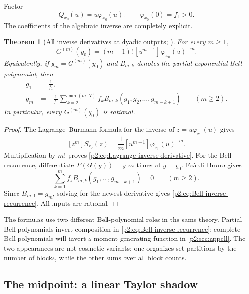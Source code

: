 \documentclass[11pt,oneside]{article}
\numberwithin{equation}{section}
\newtheorem{theorem}{Theorem}[section]
\theoremstyle{definition}
\theoremstyle{remark}
\newcommand{\InvF}{G}
\begin{document}
Factor
\begin{equation}
 Q_{x_0}(u)=u\varphi_{x_0}(u),
 \qquad
 \varphi_{x_0}(0)=f_1>0.
 \label{p2:eq:Q-phi}
\end{equation}
The coefficients of the algebraic inverse are completely explicit.

\begin{theorem}[All inverse derivatives at dyadic outputs; \statusnew]
\label{p2:thm:inverse-derivatives}
For every $m\ge1$,
\begin{equation}
 \boxed{
 \InvF^{(m)}(y_0)
 =(m-1)!\,[u^{m-1}]\,\varphi_{x_0}(u)^{-m}.
 }
 \label{p2:eq:Lagrange-inverse-derivative}
\end{equation}
Equivalently, if $g_m=\InvF^{(m)}(y_0)$ and $B_{m,k}$ denotes the partial exponential Bell
polynomial, then
\begin{align}
 g_1&=\frac1{f_1},
 \label{p2:eq:g1}\\
 g_m&=-\frac1{f_1}
 \sum_{k=2}^{\min(m,N)}f_k
 B_{m,k}(g_1,g_2,\ldots,g_{m-k+1})
 \qquad(m\ge2).
 \label{p2:eq:Bell-inverse-recurrence}
\end{align}
In particular, every $\InvF^{(m)}(y_0)$ is rational.
\end{theorem}

\begin{proof}
The Lagrange--B\"urmann formula for the inverse of $z=u\varphi_{x_0}(u)$ gives
\[
 [z^m]S_{x_0}(z)=\frac1m[u^{m-1}]\varphi_{x_0}(u)^{-m}.
\]
Multiplication by $m!$ proves \eqref{p2:eq:Lagrange-inverse-derivative}.  For the Bell recurrence,
differentiate $F(\InvF(y))=y$ $m$ times at $y=y_0$.  Fa\`a di Bruno gives
\[
 \sum_{k=1}^{m} f_k B_{m,k}(g_1,\ldots,g_{m-k+1})=0\qquad(m\ge2).
\]
Since $B_{m,1}=g_m$, solving for the newest derivative gives
\eqref{p2:eq:Bell-inverse-recurrence}.  All inputs are rational.
\end{proof}

\begin{remark}
The formulas use two different Bell-polynomial roles in the same theory.  Partial Bell polynomials
invert composition in \eqref{p2:eq:Bell-inverse-recurrence}; complete Bell polynomials will invert a
moment generating function in \cref{p2:sec:appell}.  The two appearances are not cosmetic variants:
one organizes set partitions by the number of blocks, while the other sums over all block counts.
\end{remark}

\subsection{The midpoint: a linear Taylor shadow}
\end{document}
